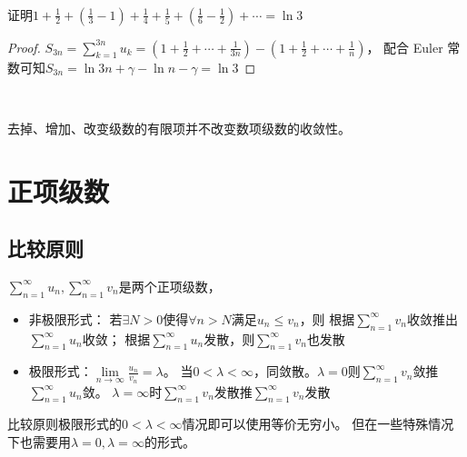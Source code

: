 ~

\begin{exercise}[交错子列]
  证明$1 + \frac{1}{2} + (\frac{1}{3} - 1) + \frac{1}{4} + \frac{1}{5} + (\frac{1}{6} - \frac{1}{2}) + \cdots = \ln 3$
\end{exercise}

\begin{proof}
  $S_{3n} = \sum\limits_{k = 1}^{3n}u_{k} = (1 + \frac{1}{2} + \cdots + \frac{1}{3n}) - (1 + \frac{1}{2} + \cdots + \frac{1}{n})$，
  配合 Euler 常数可知$S_{3n} = \ln 3n + \gamma - \ln n - \gamma = \ln 3$
\end{proof}

~

\begin{theorem}[去除有限项]
  去掉、增加、改变级数的有限项并不改变数项级数的收敛性。
\end{theorem}

\section{正项级数}

\subsection{比较原则}

\begin{theorem}[比较原则]
  $\sum\limits_{n = 1}^{\infty}u_n, \sum\limits_{n = 1}^{\infty}v_n$是两个正项级数，
  \begin{itemize}
  \item 非极限形式：
    若$\exists N > 0$使得$\forall n > N$满足$u_n \leq v_n$，则
    根据$\sum\limits_{n = 1}^{\infty}v_n$收敛推出$\sum\limits_{n = 1}^{\infty}u_n$收敛；
    根据$\sum\limits_{n = 1}^{\infty}u_n$发散，则$\sum\limits_{n = 1}^{\infty}v_n$也发散
  \item 极限形式：$\lim \limits _{n \rightarrow \infty} \frac{u_n}{v_n} = \lambda$。
    当$0 < \lambda < \infty$，同敛散。$\lambda = 0$则$\sum\limits_{n = 1}^{\infty}v_n$敛推$\sum\limits_{n = 1}^{\infty}u_n$敛。
    $\lambda = \infty$时$\sum\limits_{n = 1}^{\infty}v_n$发散推$\sum\limits_{n = 1}^{\infty}v_n$发散
  \end{itemize}
\end{theorem}

\begin{note}
  比较原则极限形式的$0 < \lambda < \infty$情况即可以使用等价无穷小。
  但在一些特殊情况下也需要用$\lambda = 0, \lambda = \infty$的形式。
\end{note}

